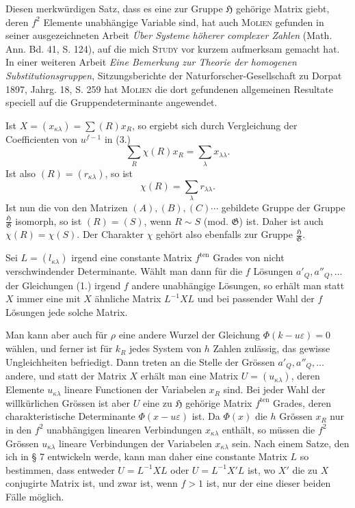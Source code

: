 \documentclass[11pt]{article}
\newcommand{\Hgrp}{\mathfrak{H}}
\newcommand{\Ggrp}{\mathfrak{G}}
\newcommand{\eps}{\varepsilon}
\newcommand{\ten}{\mathrm{ten}}
\begin{document}
Diesen merkwürdigen Satz, dass es eine zur Gruppe $\Hgrp$ gehörige Matrix giebt, deren $f^2$ Elemente unabhängige Variable sind, hat auch \textsc{Molien} gefunden in seiner ausgezeichneten Arbeit \emph{Über Systeme höherer complexer Zahlen} (Math. Ann. Bd. 41, S. 124), auf die mich \textsc{Study} vor kurzem aufmerksam gemacht hat. In einer weiteren Arbeit \emph{Eine Bemerkung zur Theorie der homogenen Substitutionsgruppen}, Sitzungsberichte der Naturforscher-Gesellschaft zu Dorpat 1897, Jahrg. 18, S. 259 hat \textsc{Molien} die dort gefundenen allgemeinen Resultate speciell auf die Gruppendeterminante angewendet.

Ist $X=(x_{\kappa\lambda})=\sum(R)x_R$, so ergiebt sich durch Vergleichung der Coefficienten von $u^{f-1}$ in (3.)
\begin{equation}\tag{4.}
\sum_R\chi(R)x_R=\sum_\lambda x_{\lambda\lambda}.
\end{equation}
Ist also $(R)=(r_{\kappa\lambda})$, so ist
\begin{equation}\tag{5.}
\chi(R)=\sum_\lambda r_{\lambda\lambda}.
\end{equation}
Ist nun die von den Matrizen $(A),(B),(C)\cdots$ gebildete Gruppe der Gruppe $\frac{\Hgrp}{\Ggrp}$ isomorph, so ist $(R)=(S)$, wenn $R\sim S$ (mod. $\Ggrp$) ist. Daher ist auch $\chi(R)=\chi(S)$. Der Charakter $\chi$ gehört also ebenfalls zur Gruppe $\frac{\Hgrp}{\Ggrp}$.

Sei $L=(l_{\kappa\lambda})$ irgend eine constante Matrix $f^{\ten}$ Grades von nicht verschwindender Determinante. Wählt man dann für die $f$ Lösungen $a'_Q,a''_Q,\ldots$ der Gleichungen (1.) irgend $f$ andere unabhängige Lösungen, so erhält man statt $X$ immer eine mit $X$ ähnliche Matrix $L^{-1}XL$ und bei passender Wahl der $f$ Lösungen jede solche Matrix.

Man kann aber auch für $\rho$ eine andere Wurzel der Gleichung $\Phi(k-u\eps)=0$ wählen, und ferner ist für $k_R$ jedes System von $h$ Zahlen zulässig, das gewisse Ungleichheiten befriedigt. Dann treten an die Stelle der Grössen $a'_Q,a''_Q,\ldots$ andere, und statt der Matrix $X$ erhält man eine Matrix $U=(u_{\kappa\lambda})$, deren Elemente $u_{\kappa\lambda}$ lineare Functionen der Variabelen $x_R$ sind. Bei jeder Wahl der willkürlichen Grössen ist aber $U$ eine zu $\Hgrp$ gehörige Matrix $f^{\ten}$ Grades, deren charakteristische Determinante $\Phi(x-u\eps)$ ist. Da $\Phi(x)$ die $h$ Grössen $x_R$ nur in den $f^2$ unabhängigen linearen Verbindungen $x_{\kappa\lambda}$ enthält, so müssen die $f^2$ Grössen $u_{\kappa\lambda}$ lineare Verbindungen der Variabelen $x_{\kappa\lambda}$ sein. Nach einem Satze, den ich in § 7 entwickeln werde, kann man daher eine constante Matrix $L$ so bestimmen, dass entweder $U=L^{-1}XL$ oder $U=L^{-1}X'L$ ist, wo $X'$ die zu $X$ conjugirte Matrix ist, und zwar ist, wenn $f>1$ ist, nur der eine dieser beiden Fälle möglich.
\end{document}
